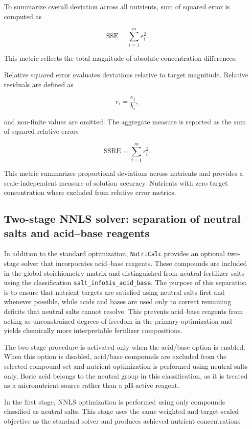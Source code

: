 \documentclass[
  letterpaper,
  DIV=11,
  numbers=noendperiod]{scrreprt}
\begin{document}
To summarize overall deviation across all nutrients, sum of squared
error is computed as

\[
\mathrm{SSE} = \sum_{i=1}^{m} e_i^2 .
\]

This metric reflects the total magnitude of absolute concentration
differences.

Relative squared error evaluates deviations relative to target
magnitude. Relative residuals are defined as

\[
r_i = \frac{e_i}{b_i},
\]

and non-finite values are omitted. The aggregate measure is reported as
the sum of squared relative errors

\[
\mathrm{SSRE} = \sum_{i=1}^{m} r_i^2 .
\]

This metric summarizes proportional deviations across nutrients and
provides a scale-independent measure of solution accuracy. Nutrients
with zero target concentration where excluded from relative error
metrics.

\subsection{Two-stage NNLS solver: separation of neutral salts and
acid--base
reagents}\label{two-stage-nnls-solver-separation-of-neutral-salts-and-acidbase-reagents}

In addition to the standard optimization, \texttt{NutriCalc} provides an
optional two-stage solver that incorporates acid--base reagents. These
compounds are included in the global stoichiometry matrix and
distinguished from neutral fertilizer salts using the classification
\texttt{salt\_info\$is\_acid\_base}. The purpose of this separation is
to ensure that nutrient targets are satisfied using neutral salts first
and whenever possible, while acids and bases are used only to correct
remaining deficits that neutral salts cannot resolve. This prevents
acid--base reagents from acting as unconstrained degrees of freedom in
the primary optimization and yields chemically more interpretable
fertilizer compositions.

The two-stage procedure is activated only when the acid/base option is
enabled. When this option is disabled, acid/base compounds are excluded
from the selected compound set and nutrient optimization is performed
using neutral salts only. Boric acid belongs to the neutral group in
this classification, as it is treated as a micronutrient source rather
than a pH-active reagent.

In the first stage, NNLS optimization is performed using only compounds
classified as neutral salts. This stage uses the same weighted and
target-scaled objective as the standard solver and produces achieved
nutrient concentrations
\end{document}
